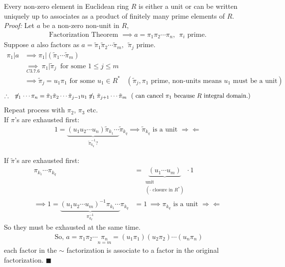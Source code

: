 \begin{theorem}
    Every non-zero element in Euclidean ring $R$ is either a unit or can be written uniquely up to associates as a product of finitely many prime elements of $R$. \\

    \noindent \textit{Proof: } Let $a$ be a non-zero non-unit in $R$,
    \begin{align*}
        \text{Factorization Theorem } \implies a=\pi_1 \pi_2 \cdots \pi_n, \ \ \pi_i \text{ prime}.
    \end{align*}
    Suppose $a$ also factors as $a= \tilde{\pi}_1 \tilde{\pi}_2 \cdots \tilde{\pi}_m,  \ \ \tilde{\pi}_j \text{ prime}$.
    \begin{align*}
        \pi_1| a &\implies \pi_1 | (\tilde{\pi}_1 \cdots \tilde{\pi}_m) \\
        &\underset{C3.7.6}{\implies} \pi_1 | \tilde{\pi}_j \ \text{ for some } 1\leq j \leq m \\
        &\implies \tilde{\pi}_j =u_1\pi_1 \text{ for some }u_1 \in R^* \ \ \ \ (\tilde{\pi}_j, \pi_1 \text{ prime, non-units means }u_1\text{ must be a unit})
    \end{align*}
    \begin{align*}
        \therefore \ \ \  \not \mathrel{\pi_1}\cdots \pi_n = \tilde{\pi}_1 \tilde{\pi}_2 \cdots \tilde{\pi}_{j-1} u_1 \not \mathrel{\pi_1} \tilde{\pi}_{j+1}\cdots \tilde{\pi}_m \ \ (\text{ can cancel }\pi_1 \text{ because }R\text{ integral domain.})
    \end{align*}
    Repeat process with $\pi_2$, $\pi_3$ etc. \\
    
    \noindent If $\pi$'s are exhausted first:
    \begin{align*}
        1=\underbrace{(u_1 u_2 \cdots u_n)\tilde{\pi}_{k_1}\cdots}_{\tilde{\pi}_{k_q}^{-1}?}\tilde{\pi}_{k_q} \implies \tilde{\pi}_{k_q} \text{ is a unit }\Rightarrow \Leftarrow
    \end{align*}

    \noindent If $\tilde{\pi}$'s are exhausted first:
    \begin{align*}
        \pi_{k_1}\cdots \pi_{k_q} &= \underbrace{(u_1\cdots u_m)}_{\substack{\text{unit }\\(\cdot \text{ closure in }R^*)}}\cdot 1 \\
        \implies 1=\underbrace{(u_1 u_2 \cdots u_m)^{-1}\pi_{k_1}\cdots}_{\pi_{k_q}^{-1}}\pi_{k_q}&= 1 \ \implies \pi_{k_q} \text{ is a unit }\Rightarrow\Leftarrow
    \end{align*}
    So they must be exhausted at the same time. \\

    \begin{align*}
        \text{ So, }a= \pi_1 \pi_2 \cdots \underset{n=m}{\pi_n} = (u_1\pi_1)(u_2 \pi_2)\cdots (u_n\pi_n)
    \end{align*}
    each factor in the $\sim$ factorization is associate to a factor in the original factorization. $\blacksquare$
\end{theorem}
